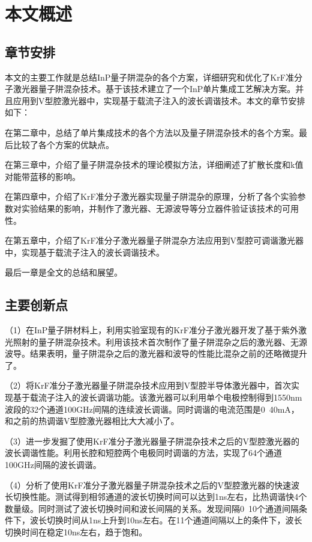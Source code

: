 \documentclass[oneside]{ZJUthesis}
\begin{document}
\section{本文概述}

\subsection{章节安排}
本文的主要工作就是总结InP量子阱混杂的各个方案，详细研究和优化了KrF准分子激光器量子阱混杂技术。基于该技术建立了一个InP单片集成工艺解决方案。并且应用到V型腔激光器中，实现基于载流子注入的波长调谐技术。本文的章节安排如下：

在第二章中，总结了单片集成技术的各个方法以及量子阱混杂技术的各个方案。最后比较了各个方案的优缺点。

在第三章中，介绍了量子阱混杂技术的理论模拟方法，详细阐述了扩散长度和k值对能带蓝移的影响。

在第四章中，介绍了KrF准分子激光器实现量子阱混杂的原理，分析了各个实验参数对实验结果的影响，并制作了激光器、无源波导等分立器件验证该技术的可用性。

在第五章中，介绍了KrF准分子激光器量子阱混杂方法应用到V型腔可调谐激光器中，实现基于载流子注入的波长调谐技术。

最后一章是全文的总结和展望。

\subsection{主要创新点}

（1）在InP量子阱材料上，利用实验室现有的KrF准分子激光器开发了基于紫外激光照射的量子阱混杂技术。利用该技术首次制作了量子阱混杂之后的激光器、无源波导。结果表明，量子阱混杂之后的激光器和波导的性能比混杂之前的还略微提升了。

（2）将KrF准分子激光器量子阱混杂技术应用到V型腔半导体激光器中，首次实现基于载流子注入的波长调谐功能。该激光器可以利用单个电极控制得到1550nm波段的32个通道100GHz间隔的连续波长调谐。同时调谐的电流范围是0~40mA，和之前的热调谐V型腔激光器相比大大减小了。

（3）进一步发掘了使用KrF准分子激光器量子阱混杂技术之后的V型腔激光器的波长调谐性能。利用长腔和短腔两个电极同时调谐的方法，实现了64个通道100GHz间隔的波长调谐。

（4）分析了使用KrF准分子激光器量子阱混杂技术之后的V型腔激光器的快速波长切换性能。测试得到相邻通道的波长切换时间可以达到1ns左右，比热调谐快4个数量级。同时测试了波长切换时间和波长间隔的关系。发现间隔0~10个通道间隔条件下，波长切换时间从1ns上升到10ns左右。在11个通道间隔以上的条件下，波长切换时间在稳定10ns左右，趋于饱和。
\end{document}
